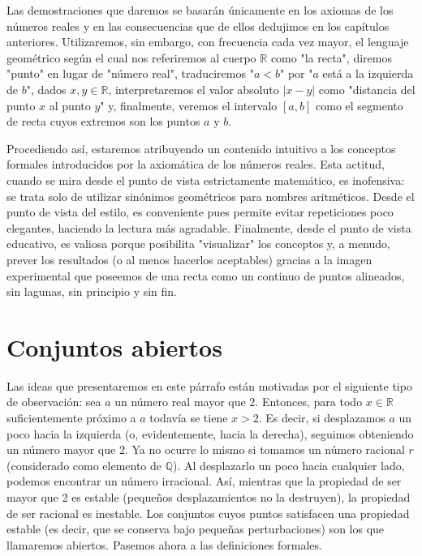 \documentclass[12pt,oneside]{book}
\begin{document}
Las demostraciones que daremos se basarán únicamente en los axiomas de los números reales y en las consecuencias que de ellos dedujimos en los capítulos anteriores. Utilizaremos, sin embargo, con frecuencia cada vez mayor, el lenguaje geométrico según el cual nos referiremos al cuerpo \(\mathbb{R}\) como "la recta", diremos "punto" en lugar de "número real", traduciremos "\(a < b\)" por "\(a\) está a la izquierda de \(b\)", dados \(x, y \in \mathbb{R}\), interpretaremos el valor absoluto \(|x - y|\) como "distancia del punto \(x\) al punto \(y\)" y, finalmente, veremos el intervalo \([a, b]\) como el segmento de recta cuyos extremos son los puntos \(a\) y \(b\).

Procediendo así, estaremos atribuyendo un contenido intuitivo a los conceptos formales introducidos por la axiomática de los números reales. Esta actitud, cuando se mira desde el punto de vista estrictamente matemático, es inofensiva: se trata solo de utilizar sinónimos geométricos para nombres aritméticos. Desde el punto de vista del estilo, es conveniente pues permite evitar repeticiones poco elegantes, haciendo la lectura más agradable. Finalmente, desde el punto de vista educativo, es valiosa porque posibilita "visualizar" los conceptos y, a menudo, prever los resultados (o al menos hacerlos aceptables) gracias a la imagen experimental que poseemos de una recta como un continuo de puntos alineados, sin lagunas, sin principio y sin fin.

\section{Conjuntos abiertos}

Las ideas que presentaremos en este párrafo están motivadas por el siguiente tipo de observación: sea \(a\) un número real mayor que 2. Entonces, para todo \(x \in \mathbb{R}\) suficientemente próximo a \(a\) todavía se tiene \(x > 2\). Es decir, si desplazamos \(a\) un poco hacia la izquierda (o, evidentemente, hacia la derecha), seguimos obteniendo un número mayor que 2. Ya no ocurre lo mismo si tomamos un número racional \(r\) (considerado como elemento de \(\mathbb{Q}\)). Al desplazarlo un poco hacia cualquier lado, podemos encontrar un número irracional. Así, mientras que la propiedad de ser mayor que 2 es estable (pequeños desplazamientos no la destruyen), la propiedad de ser racional es inestable. Los conjuntos cuyos puntos satisfacen una propiedad estable (es decir, que se conserva bajo pequeñas perturbaciones) son los que llamaremos abiertos. Pasemos ahora a las definiciones formales.
\end{document}

